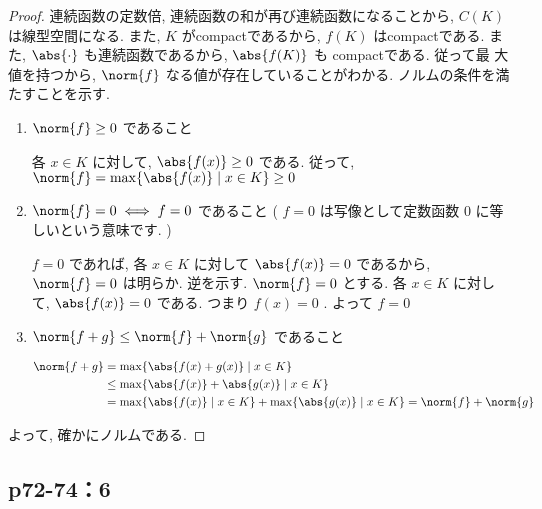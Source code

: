 \documentclass[a4paper,10pt,fleqn]{ltjsarticle}
\begin{document}
\begin{leftbar}
	\begin{proof}
	連続函数の定数倍, 連続函数の和が再び連続函数になることから, $C ( K )$ は線型空間になる. また, $K$ がcompactであるから, $f ( K )$ はcompactである. また, $\abs{ \cdot }$ も連続函数であるから, $\abs{ f ( K ) }$ も compactである. 従って最
	大値を持つから, $\norm{ f }$ なる値が存在していることがわかる. ノルムの条件を満たすことを示す. 
		\begin{enumerate}
			\item $\norm{ f } \geq 0$ であること
				
				\zw 各 $x \in K$ に対して, $\abs{f ( x ) } \geq 0$ である. 従って, $\norm{ f } = \max \{ \abs{ f ( x )} \mid x \in K \} \geq 0$
				
			\item $\norm{ f } = 0 \iff  f = 0$ であること ( $f = 0$ は写像として定数函数 $0$ に等しいという意味です. )	
				
				$f = 0$ であれば, 各 $x \in K$ に対して $\abs{ f ( x ) } = 0$ であるから, $\norm{ f } = 0$ は明らか. 逆を示す. $\norm{ f } = 0$ とする. 各 $x \in K$ に対して, $\abs{ f ( x ) } = 0$ である. つまり $f ( x ) = 0$ . よって $f = 0$
				
			\item $\norm{ f + g } \leq \norm{ f } + \norm{ g }$ であること
			
				\begin{align*}
					\norm{ f + g } & =  \max \{ \abs{ f ( x ) + g ( x )} \mid x \in K \} \\
					& \leq  \max \{ \abs{ f ( x ) } + \abs{ g ( x ) } \mid x \in K \} \\
					& =  \max \{ \abs{ f ( x ) }  \mid x \in K \} + \max \{ \abs{ g ( x ) }  \mid x \in K \} = \norm{ f } + \norm{ g }
				\end{align*}
		\end{enumerate}
	よって, 確かにノルムである. 
\end{proof}
\end{leftbar}
\newpage

\subsection*{p72-74：6}
\end{document}
